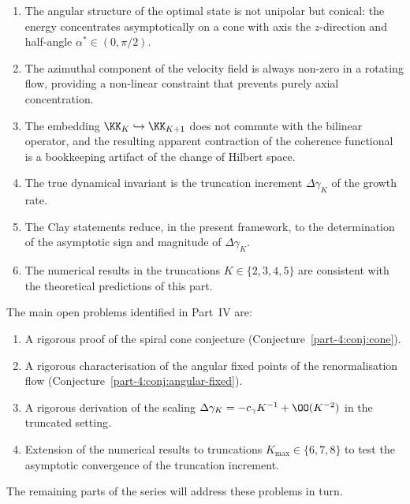 \begin{enumerate}[label=(\arabic*),leftmargin=*]
\item The angular structure of the optimal state is not unipolar 
      but conical: the energy concentrates asymptotically on a cone 
      with axis the $z$-direction and half-angle 
      $\alpha^\ast\in(0,\pi/2)$.

\item The azimuthal component of the velocity field is always 
      non-zero in a rotating flow, providing a non-linear constraint 
      that prevents purely axial concentration.

\item The embedding $\KK_K\hookrightarrow\KK_{K+1}$ does not commute 
      with the bilinear operator, and the resulting apparent 
      contraction of the coherence functional is a bookkeeping 
      artifact of the change of Hilbert space.

\item The true dynamical invariant is the truncation increment 
      $\Delta\gamma_K$ of the growth rate.

\item The Clay statements reduce, in the present framework, to the 
      determination of the asymptotic sign and magnitude of 
      $\Delta\gamma_K$.

\item The numerical results in the truncations $K\in\{2,3,4,5\}$ 
      are consistent with the theoretical predictions of this part.
\end{enumerate}

The main open problems identified in Part~IV are:

\begin{enumerate}[label=(\Alph*),leftmargin=*]
\item A rigorous proof of the spiral cone conjecture 
      (Conjecture~\ref{part-4:conj:cone}).
\item A rigorous characterisation of the angular fixed points of 
      the renormalisation flow (Conjecture~\ref{part-4:conj:angular-fixed}).
\item A rigorous derivation of the scaling 
      $\Delta\gamma_K = -c_\gamma K^{-1} + \OO(K^{-2})$ in the 
      truncated setting.
\item Extension of the numerical results to truncations 
      $K_{\max}\in\{6,7,8\}$ to test the asymptotic convergence of 
      the truncation increment.
\end{enumerate}

The remaining parts of the series will address these problems in turn.


